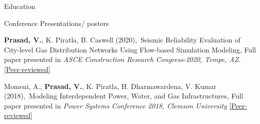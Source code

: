 \documentclass{resume} %
\begin{document}
\begin{rSection}{Education}
\begin{rSection}{Conference Presentations/ posters}
\item \textbf{Prasad, V.}, K. Piratla, B. Caswell (2020),\ {Seismic Reliability Evaluation of City-level Gas Distribution Networks Using Flow-based Simulation Modeling, Full paper presented in \textit{ASCE Construction Research Congress-2020, Tempe, AZ. }\href{https://ascelibrary.org/doi/10.1061/9780784482858.043}{[Peer-reviewed]}} \\

 \item Momeni, A., \textbf{Prasad, V.}, K. Piratla, H. Dharmawardena, V. Kumar (2018),\ {Modeling Interdependent Power, Water, and Gas Infrastructures, Full paper presented in \textit{Power Systems Conference 2018, Clemson University}} \href{https://ieeexplore.ieee.org/document/8664050}{[Peer-reviewed]}\\ 

\end{rSection}

\end{rSection}


\end{document}
